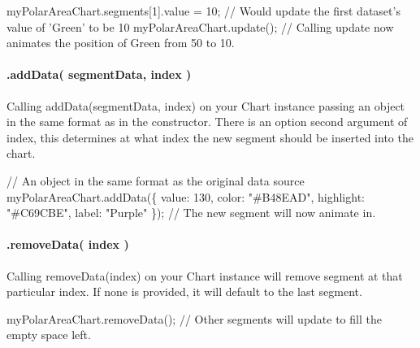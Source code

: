 \begin{DoxyCode}
myPolarAreaChart.segments[1].value = 10;
// Would update the first dataset's value of 'Green' to be 10
myPolarAreaChart.update();
// Calling update now animates the position of Green from 50 to 10.
\end{DoxyCode}


\paragraph*{.add\+Data( segment\+Data, index )}

Calling {\ttfamily add\+Data(segment\+Data, index)} on your Chart instance passing an object in the same format as in the constructor. There is an option second argument of \textquotesingle{}index\textquotesingle{}, this determines at what index the new segment should be inserted into the chart.


\begin{DoxyCode}
// An object in the same format as the original data source
myPolarAreaChart.addData(\{
    value: 130,
    color: "#B48EAD",
    highlight: "#C69CBE",
    label: "Purple"
\});
// The new segment will now animate in.
\end{DoxyCode}


\paragraph*{.remove\+Data( index )}

Calling {\ttfamily remove\+Data(index)} on your Chart instance will remove segment at that particular index. If none is provided, it will default to the last segment.


\begin{DoxyCode}
myPolarAreaChart.removeData();
// Other segments will update to fill the empty space left.
\end{DoxyCode}
 